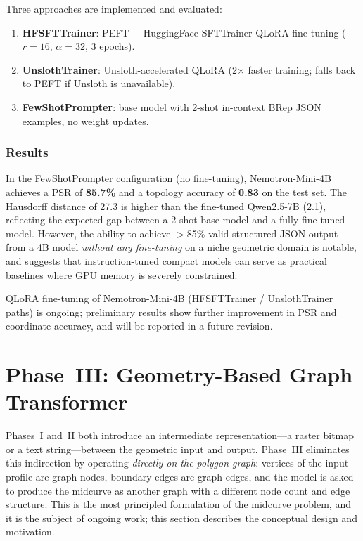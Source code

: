 \documentclass[journal]{IEEEtran}
\begin{document}
Three approaches are implemented and evaluated:
\begin{enumerate}
  \item \textbf{HFSFTTrainer}: PEFT + HuggingFace SFTTrainer QLoRA fine-tuning
        ($r=16$, $\alpha=32$, 3 epochs).
  \item \textbf{UnslothTrainer}: Unsloth-accelerated QLoRA (2$\times$ faster
        training; falls back to PEFT if Unsloth is unavailable).
  \item \textbf{FewShotPrompter}: base model with 2-shot in-context BRep JSON
        examples, no weight updates.
\end{enumerate}

\subsubsection{Results}

In the FewShotPrompter configuration (no fine-tuning), Nemotron-Mini-4B achieves
a PSR of \textbf{85.7\%} and a topology accuracy of \textbf{0.83} on the
test set.  The Hausdorff distance of 27.3 is higher than the fine-tuned
Qwen2.5-7B (2.1), reflecting the expected gap between a 2-shot base model and
a fully fine-tuned model.  However, the ability to achieve $>$85\% valid
structured-JSON output from a 4B model \emph{without any fine-tuning} on a
niche geometric domain is notable, and suggests that instruction-tuned compact
models can serve as practical baselines where GPU memory is severely
constrained.

QLoRA fine-tuning of Nemotron-Mini-4B (HFSFTTrainer / UnslothTrainer paths) is
ongoing; preliminary results show further improvement in PSR and coordinate
accuracy, and will be reported in a future revision.

\section{Phase~III: Geometry-Based Graph Transformer}
\label{sec:phase3}

Phases~I and~II both introduce an intermediate representation—a raster bitmap
or a text string—between the geometric input and output.  Phase~III eliminates
this indirection by operating \emph{directly on the polygon graph}: vertices
of the input profile are graph nodes, boundary edges are graph edges, and the
model is asked to produce the midcurve as another graph with a different node
count and edge structure.  This is the most principled formulation of the
midcurve problem, and it is the subject of ongoing work; this section describes
the conceptual design and motivation.
\end{document}

